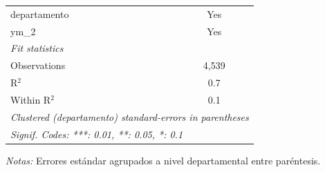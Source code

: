 \documentclass[12pt]{article}
\begin{document}
\begin{table}[htbp]
\begin{threeparttable}
\begin{tabular}{lc}
      departamento                                                                    & Yes\\  
      ym\_2                                                                           & Yes\\  
      \midrule
      \emph{Fit statistics}\\
      Observations                                                                    & 4,539\\  
      R$^2$                                                                           & 0.7\\  
      Within R$^2$                                                                    & 0.1\\  
      \midrule \midrule
      \multicolumn{2}{l}{\emph{Clustered (departamento) standard-errors in parentheses}}\\
      \multicolumn{2}{l}{\emph{Signif. Codes: ***: 0.01, **: 0.05, *: 0.1}}\\
   \end{tabular}


\begin{tablenotes}
\footnotesize
\item \textit{Notas:} Errores estándar agrupados a nivel departamental entre paréntesis.
\end{tablenotes}
\end{threeparttable}
\end{table}
\end{document}
